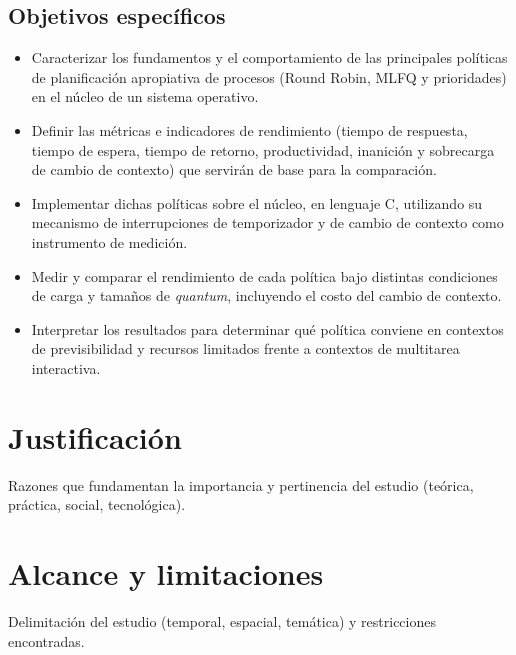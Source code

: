 \subsection{Objetivos específicos}
\begin{itemize}
  \item Caracterizar los fundamentos y el comportamiento de las principales
    políticas de planificación apropiativa de procesos (Round Robin, MLFQ y
    prioridades) en el núcleo de un sistema operativo.
  \item Definir las métricas e indicadores de rendimiento (tiempo de respuesta,
    tiempo de espera, tiempo de retorno, productividad, inanición y
    sobrecarga de cambio de contexto) que servirán de base para la
    comparación.
  \item Implementar dichas políticas sobre el núcleo, en lenguaje C, utilizando
    su mecanismo de interrupciones de temporizador y de cambio de contexto como
    instrumento de medición.
  \item Medir y comparar el rendimiento de cada política bajo distintas
    condiciones de carga y tamaños de \emph{quantum}, incluyendo el costo del
    cambio de contexto.
  \item Interpretar los resultados para determinar qué política conviene en
    contextos de previsibilidad y recursos limitados frente a contextos de
    multitarea interactiva.
\end{itemize}

\section{Justificación}

Razones que fundamentan la importancia y pertinencia del estudio (teórica,
práctica, social, tecnológica).

\section{Alcance y limitaciones}

Delimitación del estudio (temporal, espacial, temática) y restricciones
encontradas.
